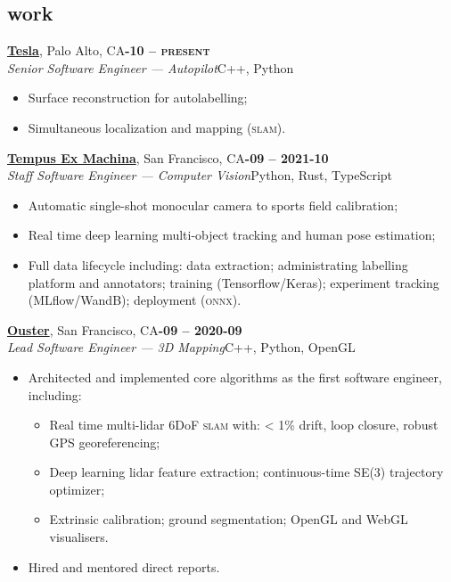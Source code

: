 \documentclass[margin,10pt]{res}
\begin{document}
\begin{resume}
\section{\sc \lsstyle work}
    \href{https://tesla.com}{\textbf{Tesla}}, Palo Alto, CA\hfill \textsc{\bfseries{}-10 -- present}\\
    \textit{Senior Software Engineer --- Autopilot}\hfill C++, Python
    \vspace{0.5em}
    \begin{itemize}
        \item Surface reconstruction for autolabelling;
        \item Simultaneous localization and mapping (\textsc{slam}).
    \end{itemize}

    \href{https://tempus-ex.com}{\textbf{Tempus Ex Machina}}, San Francisco, CA\hfill \textsc{\bfseries{}-09 -- 2021-10}\\
    \textit{Staff Software Engineer --- Computer Vision}\hfill Python, Rust, TypeScript
    \vspace{0.5em}
    \begin{itemize}
        \item Automatic single-shot monocular camera to sports field calibration;
        \item Real time deep learning multi-object tracking and human pose estimation;
        \item Full data lifecycle including: data extraction; administrating labelling platform and annotators; training (Tensorflow/Keras); experiment tracking (MLflow/WandB); deployment (\textsc{onnx}).
    \end{itemize}

    \href{https://ouster.io}{\textbf{Ouster}}, San Francisco, CA\hfill \textsc{\bfseries{}-09 -- 2020-09}\\
    \textit{Lead Software Engineer --- 3D Mapping}\hfill C++, Python, OpenGL
    \vspace{0.5em}
    \begin{itemize}
        \item Architected and implemented core algorithms as the first software engineer, including:
        \begin{itemize}
            \item Real time multi-lidar 6DoF \textsc{slam} with: < 1\% drift, loop closure, robust GPS georeferencing;
            \item Deep learning lidar feature extraction; continuous-time SE(3) trajectory optimizer;
            \item Extrinsic calibration; ground segmentation; OpenGL and WebGL visualisers.
        \end{itemize}
        \item Hired and mentored direct reports.
    \end{itemize}

\end{resume}
\end{document}
